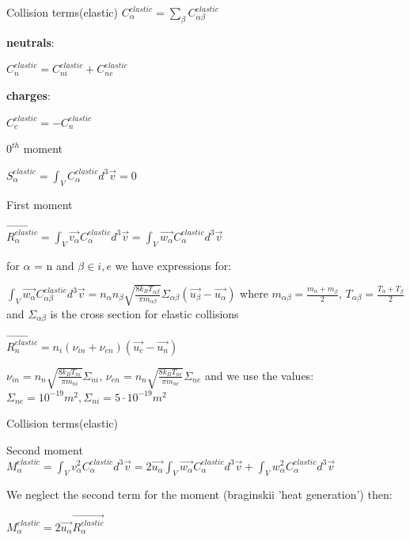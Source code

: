 \documentclass{beamer}
\begin{document}
\begin{frame}{Collision terms(elastic)}
$C_{\alpha}^{elastic} = \sum_{\beta} C_{\alpha \beta}^{elastic}$

\textbf{neutrals}:

$C_{n}^{elastic} =  C_{ni}^{elastic}  + C_{ne}^{elastic}$

\textbf{charges}:

$C_{c}^{elastic} =  -C_{n}^{elastic} $

{\color{red} $0^{th}$ moment}

$S_\alpha^{elastic} = \int_V{C_\alpha^{elastic} d^3\vec{v}} = 0 $

{\color{red} First moment}

$\vec{R_\alpha^{elastic} }= \int_V{\vec{v_\alpha} C_\alpha^{elastic} d^3\vec{v}} = \int_V{\vec{w_\alpha} C_\alpha^{elastic} d^3\vec{v}}  $

for $\alpha$ = n and $\beta \in i,e$ we have expressions for:

$\int_V{\vec{w_\alpha} C_{\alpha\beta}^{elastic} d^3\vec{v}}  = n_\alpha n_\beta \sqrt{\frac{8 k_B T_{\alpha\beta}}{\pi m_{\alpha\beta } }} \Sigma_{\alpha\beta} (\vec{u_\beta} - \vec{u_\alpha})$ 
where  $m_{\alpha\beta} = \frac{m_\alpha + m_\beta}{2}$, $T_{\alpha\beta}= \frac{T_\alpha+T_\beta}{2}$ and $\Sigma_{\alpha\beta}$ is the cross section for elastic collisions

$\vec{R_n^{elastic}} =  n_i (\nu_{in} + \nu_{en})  (\vec{u_c} - \vec{u_n})$

$\nu_{in} =n_n \sqrt{\frac{8 k_B T_{ni}}{\pi m_{ni } }} \Sigma_{ni} $, $\nu_{en} = n_n \sqrt{\frac{8 k_B T_{ne}}{\pi m_{ne } }} \Sigma_{ne}$ and we use the values: $\Sigma_{ne} = 10^{-19} m^2, \Sigma_{ni} = 5 \cdot 10^{-19} m^2$
\end{frame}

\begin{frame}{Collision terms(elastic)}

{\color{red} Second moment}
$M_\alpha^{elastic} = \int_V{v_\alpha^2 C_\alpha^{elastic} d^3\vec{v}} = 2 \vec{u_\alpha} \int_V{\vec{w_\alpha} C_\alpha^{elastic} d^3\vec{v}} + \int_V{w_\alpha^2 C_\alpha^{elastic} d^3\vec{v}}  $

We neglect the second term for the moment (braginskii 'heat generation') then:

$M_\alpha^{elastic} = 2 \vec{u_\alpha} \vec{R_\alpha^{elastic}}$ 

\end{frame}
\end{document}

